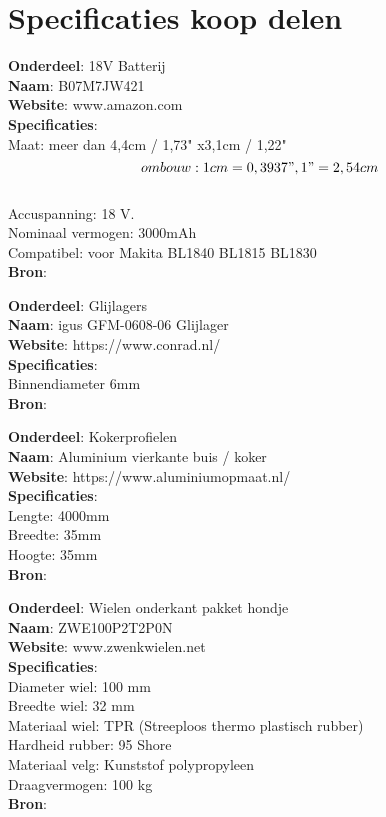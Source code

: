 \chapter{Specificaties koop delen}
\label{cha:Bijlage_G}

\textbf{Onderdeel}: 18V Batterij \\
\textbf{Naam}: B07M7JW421\\
\textbf{Website}: www.amazon.com\\
\textbf{Specificaties}:\\
Maat: meer dan 4,4cm / 1,73" x3,1cm / 1,22"\\
\[ ombouw: 1 cm = 0,3937 ", 1 " = 2,54 cm \] \\
Accuspanning: 18 V.\\
Nominaal vermogen: 3000mAh\\
Compatibel: voor Makita BL1840 BL1815 BL1830\\
\textbf{Bron}: \cite{amazon.nl}
\vspace{\baselineskip}


\textbf{Onderdeel}: Glijlagers\\  
\textbf{Naam}: igus GFM-0608-06 Glijlager\\
\textbf{Website}: https://www.conrad.nl/\\
\textbf{Specificaties}: \\
Binnendiameter 6mm\\
\textbf{Bron}: \cite{electronic}\\
\vspace{\baselineskip}

\textbf{Onderdeel}: Kokerprofielen  \\
\textbf{Naam}: Aluminium vierkante buis / koker \\
\textbf{Website}: https://www.aluminiumopmaat.nl/ \\
\textbf{Specificaties}: \\
Lengte: 4000mm \\
Breedte: 35mm \\
Hoogte: 35mm \\
\textbf{Bron}: \cite{aluminium op maat}\\
\vspace{\baselineskip}

\textbf{Onderdeel}: Wielen onderkant pakket hondje \\
\textbf{Naam}: ZWE100P2T2P0N \\
\textbf{Website}: www.zwenkwielen.net \\
\textbf{Specificaties}: \\
Diameter wiel: 100 mm \\
Breedte wiel: 32 mm \\
Materiaal wiel: TPR (Streeploos thermo plastisch rubber)\\ 
Hardheid rubber: 95 Shore \\
Materiaal velg: Kunststof polypropyleen \\
Draagvermogen: 100 kg\\
\textbf{Bron}: \cite{zwenkwielen_kopen_koop_nu_voordelig_ieder_zwenkwiel_online}

